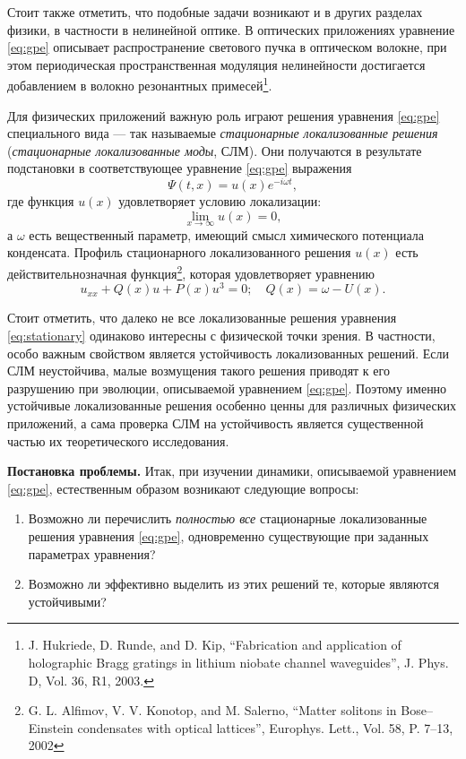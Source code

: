 \documentclass[candidate, href, colorlinks]{disser}
\begin{document}
Стоит также отметить, что подобные задачи возникают и в других разделах физики, в частности в нелинейной оптике.
В оптических приложениях уравнение \eqref{eq:gpe} описывает распространение светового пучка в оптическом волокне, при этом периодическая пространственная модуляция нелинейности достигается добавлением в волокно резонантных примесей\footnote{J. Hukriede, D. Runde, and D. Kip, ``Fabrication and application of holographic Bragg gratings in lithium niobate channel waveguides'', J. Phys. D, Vol. 36, R1, 2003.}.

Для физических приложений важную роль играют решения уравнения \eqref{eq:gpe} специального вида --- так называемые {\it стационарные локализованные решения} ({\it стационарные локализованные моды}, СЛМ).
Они получаются в результате подстановки в соответствующее уравнение \eqref{eq:gpe} выражения
\begin{equation}
	\Psi(t, x) = u(x) e^{-i \omega t},
\label{eq:ansatz}
\end{equation}
где функция $u(x)$ удовлетворяет условию локализации:
\begin{equation}
	\lim \limits_{x \to \infty} u(x) = 0,
\label{eq:localization}
\end{equation}
а $\omega$ есть вещественный параметр, имеющий смысл химического потенциала конденсата.
Профиль стационарного локализованного решения $u(x)$ есть действительнозначная функция\footnote{G. L. Alfimov, V. V. Konotop, and M. Salerno, ``Matter solitons in Bose--Einstein condensates with optical lattices'', Europhys. Lett., Vol. 58, P. 7--13, 2002}, которая удовлетворяет уравнению
\begin{equation}
	u_{xx} + Q(x) u + P(x) u^3 = 0; \quad Q(x) = \omega - U(x).
\label{eq:stationary}
\end{equation}

Стоит отметить, что далеко не все локализованные решения уравнения \eqref{eq:stationary} одинаково интересны с физической точки зрения.
В частности, особо важным свойством является устойчивость локализованных решений.
Если СЛМ неустойчива, малые возмущения такого решения приводят к его разрушению при эволюции, описываемой уравнением \eqref{eq:gpe}.
Поэтому именно устойчивые локализованные решения особенно ценны для различных физических приложений, а сама проверка СЛМ на устойчивость является существенной частью их теоретического исследования.

\textbf{Постановка проблемы.}
Итак, при изучении динамики, описываемой уравнением \eqref{eq:gpe}, естественным образом возникают следующие вопросы:
\begin{enumerate}
	\item Возможно ли перечислить {\it полностью все} стационарные локализованные решения уравнения \eqref{eq:gpe}, одновременно существующие при заданных параметрах уравнения?
	\item Возможно ли эффективно выделить из этих решений те, которые являются устойчивыми?
\end{enumerate}
\end{document}
